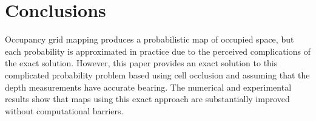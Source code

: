 \documentclass[letterpaper, 10pt, conference]{ieeeconf}
\begin{document}
\section{Conclusions}

Occupancy grid mapping produces a probabilistic map of occupied space, but each probability is approximated in practice due to the perceived complications of the exact solution.
However, this paper provides an exact solution to this complicated probability problem based using cell occlusion and assuming that the depth measurements have accurate bearing.
The numerical and experimental results show that maps using this exact approach are substantially improved without computational barriers.
	


\end{document}
